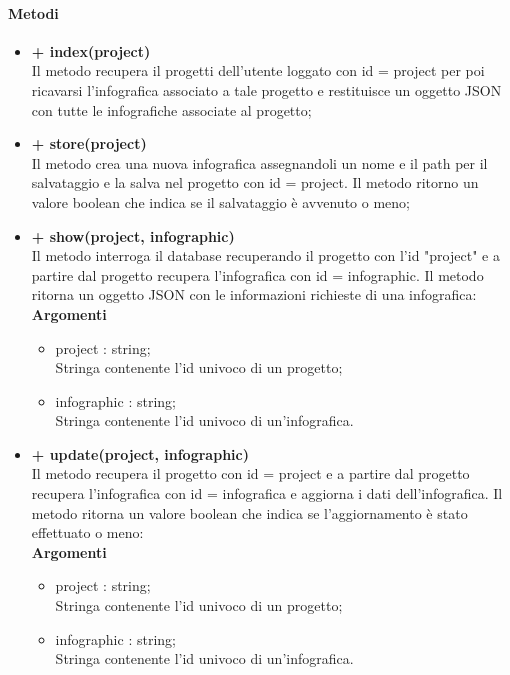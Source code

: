 	\paragraph{Metodi}
		\begin{itemize}
			\item \textbf{+ index(project)}\\
			Il metodo recupera il progetti dell'utente loggato con id = project per poi ricavarsi l'infografica associato a tale progetto e restituisce un oggetto JSON con tutte le infografiche associate al progetto;
			\item \textbf{+ store(project)}\\
			Il metodo crea una nuova infografica assegnandoli un nome e il path per il salvataggio e la salva nel progetto con id = project. Il metodo ritorno un valore boolean che indica se il salvataggio è avvenuto o meno;
			\item \textbf{+ show(project, infographic)}\\
			Il metodo interroga il database recuperando il progetto con l'id "project" e a partire dal progetto recupera l'infografica con id = infographic. Il metodo ritorna un oggetto JSON con le informazioni richieste di una infografica:\\
			\textbf{Argomenti}
			\begin{itemize}
				\item project : string; \\
				Stringa contenente l'id univoco di un progetto;
				\item infographic : string; \\
				Stringa contenente l'id univoco di un'infografica.
			\end{itemize}
			\item \textbf{+ update(project, infographic)}\\
			Il metodo recupera il progetto con id = project e a partire dal progetto recupera l'infografica con id = infografica e aggiorna i dati dell'infografica. Il metodo ritorna un valore boolean che indica se l'aggiornamento è stato effettuato o meno:\\
			\textbf{Argomenti}
			\begin{itemize}
				\item project : string; \\
				Stringa contenente l'id univoco di un progetto;
				\item infographic : string; \\
				Stringa contenente l'id univoco di un'infografica.

\end{itemize}
\end{itemize}
